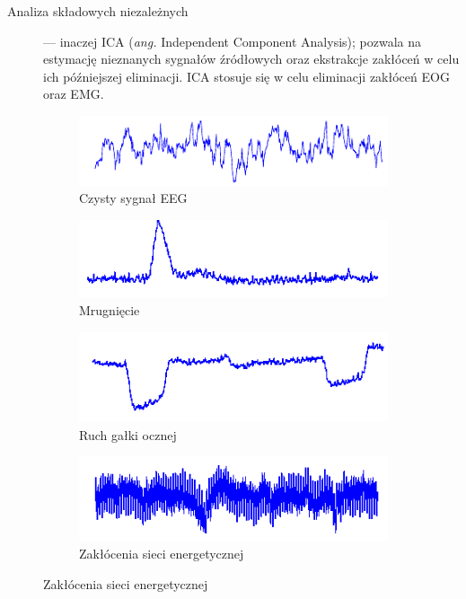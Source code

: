 \documentclass[skorowidz,skroty]{dyplomWEZUT}
\begin{document}
\begin{description}
    \item [Analiza składowych niezależnych] --- inaczej ICA (\textit{ang.} Independent Component Analysis); pozwala na estymację nieznanych sygnałów źródłowych oraz ekstrakcje zakłóceń w celu ich późniejszej eliminacji\cite{eeg_noise}. ICA stosuje się w celu eliminacji zakłóceń EOG oraz EMG\cite{bci_introduction}.
\end{description}

\begin{figure}[htb]
    \begin{subfigure}{0.48\textwidth}
    \includegraphics[width=\linewidth]{graphic/eeg_noise_clean}
    \caption{Czysty sygnał EEG}
    \end{subfigure}\hspace*{\fill}
    \begin{subfigure}{0.48\textwidth}
    \includegraphics[width=\linewidth]{graphic/eeg_noise_blink}
    \caption{Mrugnięcie}
    \end{subfigure}
    
    \medskip
    \begin{subfigure}{0.48\textwidth}
    \includegraphics[width=\linewidth]{graphic/eeg_noise_eye}
    \caption{Ruch gałki ocznej}
    \end{subfigure}\hspace*{\fill}
    \begin{subfigure}{0.48\textwidth}
    \includegraphics[width=\linewidth]{graphic/eeg_noise_line}
    \caption{Zakłócenia sieci energetycznej}
    \end{subfigure}
    

\end{figure}
\end{document}
